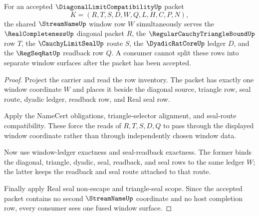 \begin{theorem}
\label{thm:diagonal-limit-compatibility-window-fusion}
For an accepted $\DiagonalLimitCompatibilityUp$ packet
$$
K=(R,T,S,D,W,Q,L,H,C,P,N),
$$
the shared $\StreamNameUp$ window row $W$ simultaneously serves the $\RealCompletenessUp$ diagonal packet $R$, the $\RegularCauchyTriangleBoundUp$ row $T$, the $\CauchyLimitSealUp$ route $S$, the $\DyadicRatCoreUp$ ledger $D$, and the $\RegSeqRatUp$ readback row $Q$. A consumer cannot split these rows into separate window surfaces after the packet has been accepted.
\end{theorem}
\begin{proof}
Project the carrier and read the row inventory. The packet has exactly one window coordinate $W$ and places it beside the diagonal source, triangle row, seal route, dyadic ledger, readback row, and Real seal row.

Apply the NameCert obligations, triangle-selector alignment, and seal-route compatibility. These force the reads of $R,T,S,D,Q$ to pass through the displayed window coordinate rather than through independently chosen window data.

Now use window-ledger exactness and seal-readback exactness. The former binds the diagonal, triangle, dyadic, seal, readback, and seal rows to the same ledger $W$; the latter keeps the readback and seal route attached to that route.

Finally apply Real seal non-escape and triangle-seal scope. Since the accepted packet contains no second $\StreamNameUp$ coordinate and no host completion row, every consumer sees one fused window surface.
\end{proof}

